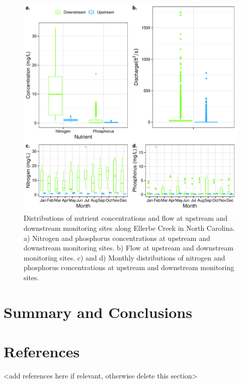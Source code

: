 \documentclass[12pt,]{article}
\begin{document}
\begin{figure}
\centering
\includegraphics{Landman_ENV872_Project_files/figure-latex/Data Analysis Figure 9-1.pdf}
\caption{Distributions of nutrient concentrations and flow at upstream
and downstream monitoring sites along Ellerbe Creek in North Carolina.
a) Nitrogen and phosphorus concentrations at upstream and downstream
monitoring sites. b) Flow at upstream and downstream monitoring sites.
c) and d) Monthly distributions of nitrogen and phosphorus
concentrations at upstream and downstream monitoring sites.}
\end{figure}

\newpage

\hypertarget{summary-and-conclusions}{%
\section{Summary and Conclusions}\label{summary-and-conclusions}}

\newpage

\hypertarget{references}{%
\section{References}\label{references}}

\textless{}add references here if relevant, otherwise delete this
section\textgreater{}
\end{document}
